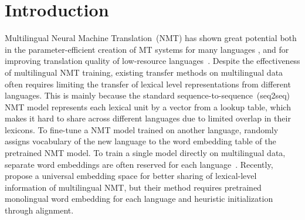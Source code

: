 \section{\label{sec:introduction}Introduction}


Multilingual Neural Machine Translation~(NMT) has shown great potential both in the parameter-efficient creation of MT systems for many languages \cite{google_multi_nmt}, and for improving translation quality of low-resource languages~\citep{multi_nmt_adapt,universal_nmt,rapid_adapt_nmt,multi_nmt_shared_attn,multi_nmt_bpe_share}.
Despite the effectiveness of multilingual NMT training, existing transfer methods on multilingual data often requires limiting the transfer  of lexical level representations from different languages.
This is mainly because the standard sequence-to-sequence~(seq2seq) NMT model represents each lexical unit by a vector from a lookup table, which makes it hard to share across different languages due to limited overlap in their lexicons.
To fine-tune a NMT model trained on another language, \cite{multi_nmt_adapt} randomly assigns vocabulary of the new language to the word embedding table of the pretrained NMT model.
To train a single model directly on multilingual data, separate word embeddings are often reserved for each language~\citep{rapid_adapt_nmt,google_multi_nmt,multi_nmt_share_enc}.
Recently, \cite{universal_nmt} propose a universal embedding space for better sharing of lexical-level information of multilingual NMT, but their method requires pretrained monolingual word embedding for each language and heuristic initialization through alignment.


